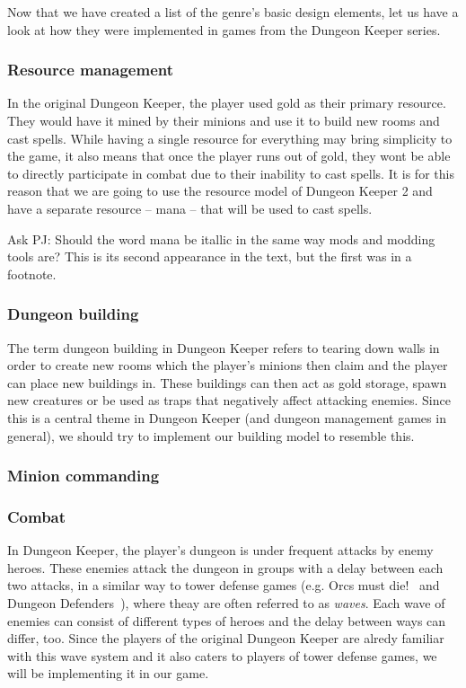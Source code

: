 Now that we have created a list of the genre's basic design elements, let us have a look at how they were implemented in games from the
Dungeon Keeper series.

\subsubsection{Resource management}

In the original Dungeon Keeper, the player used gold as their primary resource. They would have it mined by their minions and use
it to build new rooms and cast spells. While having a single resource for everything may bring simplicity to the game, it also means
that once the player runs out of gold, they wont be able to directly participate in combat due to their inability to cast spells.
It is for this reason that we are going to use the resource model of Dungeon Keeper 2 and have a separate resource -- mana -- that
will be used to cast spells.

\bigskip
Ask PJ: Should the word mana be itallic in the same way mods and modding tools are? This is its second appearance in the text, but
the first was in a footnote.

\subsubsection{Dungeon building}

The term dungeon building in Dungeon Keeper refers to tearing down walls in order to create new rooms which the player's minions 
then claim and the player can place new buildings in. These buildings can then act as gold storage, spawn new creatures or be used
as traps that negatively affect attacking enemies. Since this is a central theme in Dungeon Keeper (and dungeon management games
in general), we should try to implement our building model to resemble this.

\subsubsection{Minion commanding}


\subsubsection{Combat}

In Dungeon Keeper, the player's dungeon is under frequent attacks by enemy heroes. These enemies attack the dungeon 
in groups with a delay between each two attacks, in a similar way to tower defense games (e.g. Orcs must die!~\cite{OMD} 
and Dungeon Defenders~\cite{DungeonDefenders}), where theay are often referred to as \emph{waves}. Each wave of enemies
can consist of different types of heroes and the delay between ways can differ, too. Since the players of the original
Dungeon Keeper are alredy familiar with this wave system and it also caters to players of tower defense games, we will be
implementing it in our game.

